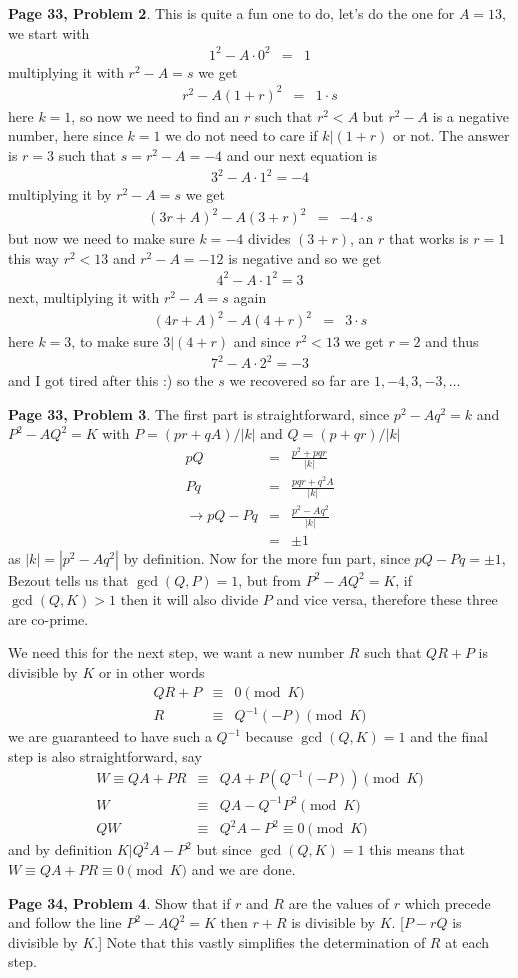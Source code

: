 \documentclass[aps,preprint,preprintnumbers,nofootinbib,showpacs,prd]{revtex4-1}
\newcommand{\nbea}{\begin{eqnarray*}}
\newcommand{\neea}{\end{eqnarray*}}
\begin{document}
{\bf Page 33, Problem 2}. This is quite a fun one to do, let's do the one for $A = 13$, we start with
%
\nbea
1^2 - A \cdot 0^2 & = & 1
\neea
%
multiplying it with $r^2 - A = s$ we get
%
\nbea
r^2 - A(1+r)^2 & = & 1\cdot s
\neea
%
here $k=1$, so now we need to find an $r$ such that $r^2 < A$ but $r^2 - A$ is a negative number, here since $k=1$ we do not need to care if $k|(1+r)$ or not. The answer is $r=3$ such that $s = r^2 - A = -4$ and our next equation is
%
\nbea
3^2 - A \cdot 1^2 = -4
\neea
%
multiplying it by $r^2 - A = s$ we get
%
\nbea
(3r + A)^2 - A(3 + r)^2 & = & -4 \cdot s
\neea
%
but now we need to make sure $k = -4$ divides $(3+r)$, an $r$ that works is $r=1$ this way $r^2 < 13$ and $r^2 - A = -12$ is negative and so we get
%
\nbea
4^2 - A\cdot1^2 = 3
\neea
%
next, multiplying it with $r^2 - A = s$ again
%
\nbea
(4r + A)^2 - A(4+r)^2 & = & 3\cdot s
\neea
%
here $k = 3$, to make sure $3|(4+r)$ and since $r^2 < 13$ we get $r=2$ and thus
%
\nbea
7^2 - A\cdot 2^2 = -3
\neea
%
and I got tired after this :) so the $s$ we recovered so far are $1,-4,3,-3, \dots$

{\bf Page 33, Problem 3}. The first part is straightforward, since $p^2 - Aq^2 = k$ and $P^2 - AQ^2 = K$ with $P = (pr + qA)/|k|$ and $Q = (p + qr)/|k|$
%
\nbea
pQ & = & \frac{p^2 + pqr}{|k|} \\
Pq & = & \frac{pqr + q^2A}{|k|} \\
\to pQ - Pq & = & \frac{p^2 - Aq^2}{|k|} \\
& = & \pm 1
\neea
%
as $|k| = |p^2-Aq^2|$ by definition. Now for the more fun part, since $pQ - Pq = \pm1$, Bezout tells us that $\gcd(Q, P) = 1$, but from $P^2 - AQ^2 = K$, if $\gcd(Q,K) > 1$ then it will also divide $P$ and vice versa, therefore these three are co-prime.

We need this for the next step, we want a new number $R$ such that $QR + P$ is divisible by $K$ or in other words
%
\nbea
QR + P & \equiv & 0 \pmod{K} \\
R & \equiv & Q^{-1}(-P) \pmod{K}
\neea
%
we are guaranteed to have such a $Q^{-1}$ because $\gcd(Q,K) = 1$ and the final step is also straightforward, say
%
\nbea
W \equiv QA + PR & \equiv & QA + P(Q^{-1}(-P)) \pmod{K} \\
W & \equiv & QA - Q^{-1} P^2 \pmod{K} \\
QW & \equiv & Q^2A - P^2 \equiv 0 \pmod{K}
\neea
%
and by definition $K|Q^2A - P^2$ but since $\gcd(Q,K) = 1$ this means that $W \equiv QA + PR \equiv 0 \pmod{K}$ and we are done.

{\bf Page 34, Problem 4}. Show that if $r$ and $R$ are the values of $r$ which precede and follow the line $P^2 - AQ^2 = K$ then $r + R$ is divisible by $K$. [$P-rQ$ is divisible by $K$.] Note that this vastly simplifies the determination of $R$ at each step.
\end{document}
